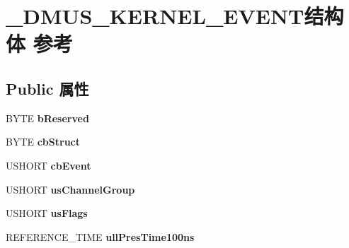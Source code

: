 \hypertarget{struct___d_m_u_s___k_e_r_n_e_l___e_v_e_n_t}{}\section{\+\_\+\+D\+M\+U\+S\+\_\+\+K\+E\+R\+N\+E\+L\+\_\+\+E\+V\+E\+N\+T结构体 参考}
\label{struct___d_m_u_s___k_e_r_n_e_l___e_v_e_n_t}
\subsection*{Public 属性}
\begin{DoxyCompactItemize}
\item 
\mbox{\label{struct___d_m_u_s___k_e_r_n_e_l___e_v_e_n_t_a3bf6801c361708a684bc5a282f2c4e45}} 
B\+Y\+TE {\bfseries b\+Reserved}
\item 
\mbox{\label{struct___d_m_u_s___k_e_r_n_e_l___e_v_e_n_t_ac7b41e70b78dc1b8bcf6b8d6fb3c7f18}} 
B\+Y\+TE {\bfseries cb\+Struct}
\item 
\mbox{\label{struct___d_m_u_s___k_e_r_n_e_l___e_v_e_n_t_a16d0279722e485e0aceab53891405638}} 
U\+S\+H\+O\+RT {\bfseries cb\+Event}
\item 
\mbox{\label{struct___d_m_u_s___k_e_r_n_e_l___e_v_e_n_t_aeb5975c8827a11e59749ccb42004fe5e}} 
U\+S\+H\+O\+RT {\bfseries us\+Channel\+Group}
\item 
\mbox{\label{struct___d_m_u_s___k_e_r_n_e_l___e_v_e_n_t_af3d4eea0efec6ac598ed4fd8565d3570}} 
U\+S\+H\+O\+RT {\bfseries us\+Flags}
\item 
\mbox{\label{struct___d_m_u_s___k_e_r_n_e_l___e_v_e_n_t_aec9439461d7cb23d3509b254154afc9f}} 
R\+E\+F\+E\+R\+E\+N\+C\+E\+\_\+\+T\+I\+ME {\bfseries ull\+Pres\+Time100ns}
\item 
\mbox{\label{struct___d_m_u_s___k_e_r_n_e_l___e_v_e_n_t_afa9ab168deda3c85dbb5000b9c93c31c}} 

\end{DoxyCompactItemize}
